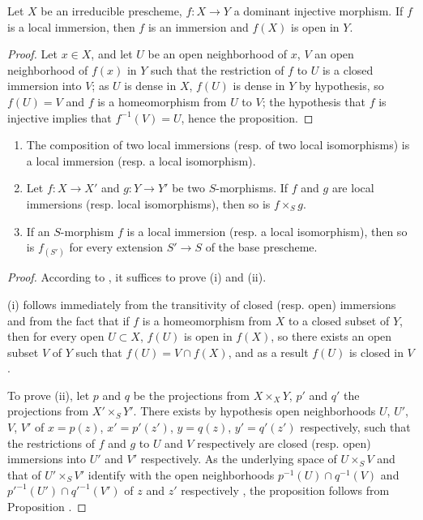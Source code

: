 \begin{prop}[4.5.4]
\label{1.4.5.4}
Let $X$ be an irreducible prescheme, $f:X\to Y$ a dominant injective morphism.
If $f$ is a local immersion, then $f$ is an immersion and $f(X)$ is open in $Y$.
\end{prop}

\begin{proof}
\label{proof-1.4.5.4}
Let $x\in X$, and let $U$ be an open neighborhood of $x$, $V$ an open neighborhood of $f(x)$ in $Y$ such that the restriction of $f$ to $U$ is a closed immersion into $V$; as $U$ is dense in $X$, $f(U)$ is dense in $Y$ by hypothesis, so $f(U)=V$ and $f$ is a homeomorphism from $U$ to $V$; the hypothesis that $f$ is injective implies that $f^{-1}(V)=U$, hence the proposition.
\end{proof}

\begin{prop}[4.5.5]
\label{1.4.5.5}
\medskip\noindent
\begin{enumerate}[label=\emph{(\roman*)}]
  \item The composition of two local immersions (resp. of two local isomorphisms) is a local immersion (resp. a local isomorphism).
  \item Let $f:X\to X'$ and $g:Y\to Y'$ be two $S$-morphisms.
    If $f$ and $g$ are local immersions (resp. local isomorphisms), then so is $f\times_S g$.
  \item If an $S$-morphism $f$ is a local immersion (resp. a local isomorphism), then so is $f_{(S')}$ for every extension $S'\to S$ of the base prescheme.
\end{enumerate}
\end{prop}

\begin{proof}
\label{proof-1.4.5.5}
According to , it suffices to prove (i) and (ii).

(i) follows immediately from the transitivity of closed (resp. open) immersions  and from the fact that if $f$ is a homeomorphism from $X$ to a closed subset of $Y$, then for every open $U\subset X$, $f(U)$ is open in $f(X)$, so there exists an open subset $V$ of $Y$ such that $f(U)=V\cap f(X)$, and as a result $f(U)$ is closed in $V$.

To prove (ii), let $p$ and $q$ be the projections from $X\times_X Y$, $p'$ and $q'$ the projections from $X'\times_S Y'$.
There exists by hypothesis open neighborhoods $U$, $U'$, $V$, $V'$ of $x=p(z)$, $x'=p'(z')$, $y=q(z)$, $y'=q'(z')$ respectively, such that the restrictions of $f$ and $g$ to $U$ and $V$ respectively are closed (resp. open) immersions into $U'$ and $V'$ respectively.
As the underlying space of $U\times_S V$ and that of $U'\times_S V'$ identify with the open neighborhoods $p^{-1}(U)\cap q^{-1}(V)$ and ${p'}^{-1}(U')\cap{q'}^{-1}(V')$ of $z$ and $z'$ respectively , the proposition follows from Proposition .
\end{proof}

